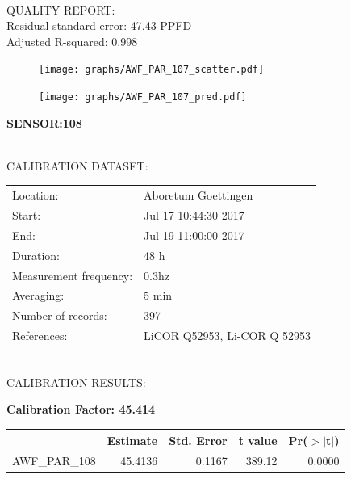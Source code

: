 \documentclass[oneside]{report}
\begin{document}
\hrulefill\\
QUALITY REPORT:\\
Residual standard error: 47.43 PPFD\\
Adjusted R-squared: 0.998



\begin{figure}[H]
  \centering
  \texttt{[image: graphs/AWF\_PAR\_107\_scatter.pdf]}
\end{figure}




\begin{figure}[H]
  \centering
  \texttt{[image: graphs/AWF\_PAR\_107\_pred.pdf]}
\end{figure}

\pagebreak


\begin{center}
\large{\textbf{SENSOR:108}}\\
\end{center}

\hrulefill\\
CALIBRATION DATASET:\\
\begin{table}[h!]
  \centering
  \label{tab:table1}
  \begin{tabular}{ll}
    Location: & Aboretum Goettingen\\ 
    
    
    Start:  & Jul 17 10:44:30 2017 \\
    End:   & Jul 19 11:00:00 2017\\ 
    Duration: & 48 h\\
    Measurement frequency: & 0.3hz\\
    Averaging:  &5 min\\
    Number of records: & 397 \\
    References: & LiCOR Q52953, Li-COR Q 52953 \\
  \end{tabular}
\end{table}

\hrulefill\\
CALIBRATION RESULTS:\\


\begin{center}
\textbf{\large{Calibration Factor: 45.414}}\\
\end{center}
\begin{table}[ht]
\centering
\begin{tabular}{rrrrr}
  \hline
 & Estimate & Std. Error & t value & Pr($>$$|$t$|$) \\ 
  \hline
AWF\_PAR\_108 & 45.4136 & 0.1167 & 389.12 & 0.0000 \\ 
   \hline
\end{tabular}
\end{table}
\end{document}
